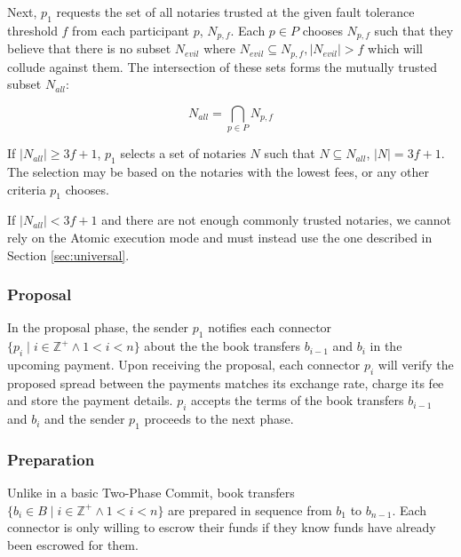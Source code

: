 \documentclass[letterpaper,twocolumn,10pt]{article}
\begin{document}
Next, $p_1$ requests the set of all notaries trusted at the given fault tolerance threshold $f$ from each participant $p$, $N_{p,f}$. Each $p \in P$ chooses $N_{p,f}$ such that they believe that there is no subset $N_{evil}$ where $N_{evil} \subseteq N_{p,f}, |N_{evil}| > f$ which will collude against them. The intersection of these sets forms the mutually trusted subset $N_{all}$:

\begin{equation}
N_{all} = \bigcap_{p \in P} N_{p,f}
\end{equation}

If $|N_{all}| \geq 3f+1$, $p_1$ selects a set of notaries $N$ such that $N \subseteq N_{all}$, $|N| = 3f + 1$. The selection may be based on the notaries with the lowest fees, or any other criteria $p_1$ chooses. 

If $|N_{all}| < 3f+1$ and there are not enough commonly trusted notaries, we cannot rely on the Atomic execution mode and must instead use the one described in Section \ref{sec:universal}.




\subsubsection{Proposal}

In the proposal phase, the sender $p_1$ notifies each connector $ \{ p_i \mid i \in \mathbb{Z}^+ \land 1 < i < n \} $ about the the book transfers $b_{i-1}$ and $b_i$ in the upcoming payment. Upon receiving the proposal, each connector $p_i$ will verify the proposed spread between the payments matches its exchange rate, charge its fee and store the payment details. $p_i$ accepts the terms of the book transfers $b_{i-1}$ and $b_i$ and the sender $p_1$ proceeds to the next phase.

\subsubsection{Preparation}


Unlike in a basic Two-Phase Commit, book transfers 
$ \{ b_i \in B \mid i \in \mathbb{Z}^+ \land 1 < i < n \} $
are prepared in sequence from $b_1$ to $b_{n-1}$. Each connector is only willing to escrow their funds if they know funds have already been escrowed for them. 
\end{document}
